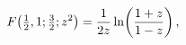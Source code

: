 \[\mathop{F\/}\nolimits\!\left(\tfrac{1}{2},1;\tfrac{3}{2};z^{2}\right)=\frac{1}%
{2z}\mathop{\ln\/}\nolimits\!\left(\frac{1+z}{1-z}\right),\]